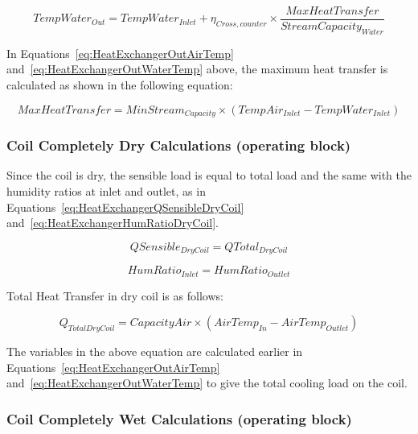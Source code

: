 \begin{equation}
TempWate{r_{Out}} = TempWate{r_{Inlet}} + {\eta_{Cross,counter}} \times \frac{{MaxHeatTransfer}}{{StreamCapacit{y_{Water}}}}
\label{eq:HeatExchangerOutWaterTemp}
\end{equation}

In Equations~\ref{eq:HeatExchangerOutAirTemp} and~\ref{eq:HeatExchangerOutWaterTemp} above, the maximum heat transfer is calculated as shown in the following equation:

\begin{equation}
MaxHeatTransfer = MinStrea{m_{Capacity}} \times (TempAi{r_{Inlet}} - TempWate{r_{Inlet}})
\end{equation}

\subsubsection{Coil Completely Dry Calculations (operating block)}\label{coil-completely-dry-calculations-operating-block}

Since the coil is dry, the sensible load is equal to total load and the same with the humidity ratios at inlet and outlet, as in Equations~\ref{eq:HeatExchangerQSensibleDryCoil} and~\ref{eq:HeatExchangerHumRatioDryCoil}.

\begin{equation}
QSensibl{e_{DryCoil}} = QTota{l_{DryCoil}}
\label{eq:HeatExchangerQSensibleDryCoil}
\end{equation}

\begin{equation}
HumRati{o_{Inlet}} = HumRati{o_{Outlet}}
\label{eq:HeatExchangerHumRatioDryCoil}
\end{equation}

Total Heat Transfer in dry coil is as follows:

\begin{equation}
{Q_{TotalDryCoil}} = CapacityAir \times (AirTem{p_{In}} - AirTem{p_{Outlet}})
\end{equation}

The variables in the above equation are calculated earlier in Equations~\ref{eq:HeatExchangerOutAirTemp} and~\ref{eq:HeatExchangerOutWaterTemp} to give the total cooling load on the coil.

\subsubsection{Coil Completely Wet Calculations (operating block)}\label{coil-completely-wet-calculations-operating-block}

